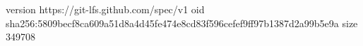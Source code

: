 version https://git-lfs.github.com/spec/v1
oid sha256:5809becf8ca609a51d8a4d45fe474e8cd83f596cefef9ff97b1387d2a99b5e9a
size 349708
